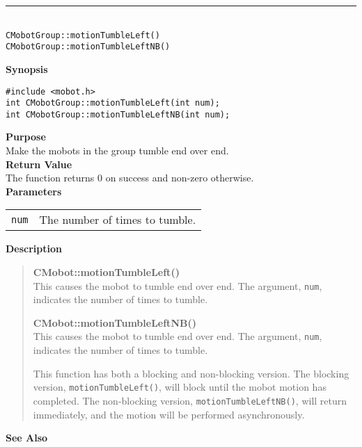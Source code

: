 \noindent
\vspace{5pt}
\rule{4.5in}{0.015in}\\
\noindent
{\LARGE \texttt{CMobotGroup::motionTumbleLeft()}}\\
{\LARGE \texttt{CMobotGroup::motionTumbleLeftNB()}}\\
{}

\noindent
{\bf Synopsis}
\vspace{-8pt}
\begin{verbatim}
#include <mobot.h>
int CMobotGroup::motionTumbleLeft(int num);
int CMobotGroup::motionTumbleLeftNB(int num);
\end{verbatim}

\noindent
{\bf Purpose}\\
Make the mobots in the group tumble end over end.\\

\noindent
{\bf Return Value}\\
The function returns 0 on success and non-zero otherwise.\\

\noindent
{\bf Parameters}\\
\vspace{-0.1in}
\begin{description}
\item               
\begin{tabular}{p{10 mm}p{145 mm}}
\texttt{num} & The number of times to tumble. \\
\end{tabular}
\end{description}

\noindent
{\bf Description}\\
\vspace{-12pt}
\begin{quote}
{\bf CMobot::motionTumbleLeft()}\\
This causes the mobot to tumble end over end. The argument, \texttt{num},
indicates the number of times to tumble.

{\bf CMobot::motionTumbleLeftNB()}\\
This causes the mobot to tumble end over end. The argument, \texttt{num},
indicates the number of times to tumble.

This function has both a blocking and non-blocking version.
The blocking version, \texttt{motionTumbleLeft()}, will block until the
mobot motion has completed. The non-blocking version, \texttt{motionTumbleLeftNB()},
will return immediately, and the motion will be performed asynchronously.\\
\end{quote}

\noindent
{\bf See Also}\\

